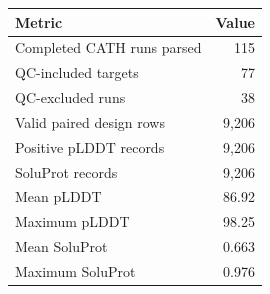 \begin{tabular}{lr}
\toprule
Metric & Value \\
\midrule
Completed CATH runs parsed & 115 \\
QC-included targets & 77 \\
QC-excluded runs & 38 \\
Valid paired design rows & 9,206 \\
Positive pLDDT records & 9,206 \\
SoluProt records & 9,206 \\
Mean pLDDT & 86.92 \\
Maximum pLDDT & 98.25 \\
Mean SoluProt & 0.663 \\
Maximum SoluProt & 0.976 \\
\bottomrule
\end{tabular}
